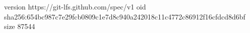 version https://git-lfs.github.com/spec/v1
oid sha256:654bc987c7e29fcb0809c1e7d8c940a242018c11c4772c86912f16cfdcd8d6bf
size 87544
